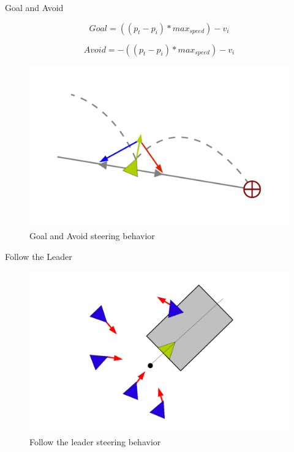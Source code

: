 \documentclass[red]{beamer}
\begin{document}
\begin{frame}{Goal and Avoid}

	\begin{equation}
	\label{goalEquation}
	Goal = ((p_t - p_i) * max_{speed}) - v_i
	\end{equation}

	\begin{equation}
	\label{avoidEquation}
	Avoid = -((p_t - p_i) * max_{speed}) - v_i
	\end{equation}
	
	\begin{figure}[htbp]
	\begin{center}
	\includegraphics[scale=0.25]{../figures/seekANDflee.pdf}
	\caption{Goal and Avoid steering behavior}
	\label{seekANDflee}
	\end{center}
	\end{figure}
\end{frame}

\begin{frame}{Follow the Leader}
	\begin{figure}[htbp]
	\begin{center}
	\includegraphics[scale=0.35]{../figures/leaderFollowing.pdf}
	\caption{Follow the leader steering behavior}
	\label{leadFollow}
	\end{center}
	\end{figure}
\end{frame}
\end{document}
